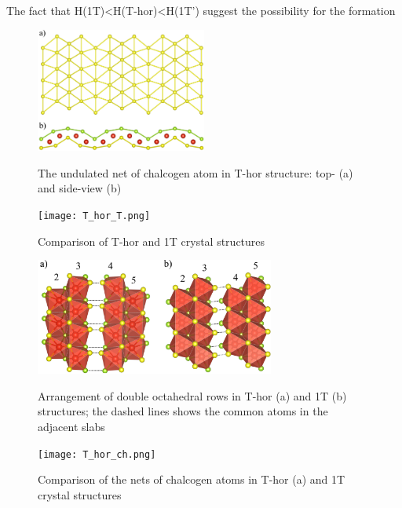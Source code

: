 \documentclass[a4paperm]{article}
\begin{document}
The fact that H(1T)<H(T-hor)<H(1T') suggest the possibility for the formation

\begin{figure}[H]
        \includegraphics[width=0.5\textwidth]{T_hor_hcb.png} \\
        \caption{The undulated net of chalcogen atom in T-hor structure: top- (a) and side-view (b)}
\label{T_hor_hcb}
\end{figure}


\begin{figure}[H]
	\texttt{[image: T\_hor\_T.png]} \\
	\caption{Comparison of T-hor and 1T crystal structures}
	\label{T_hor_T}
\end{figure}

\begin{figure}[H]
	\includegraphics[width=0.7\textwidth]{T_hor_slabs.png} \\
	\caption{Arrangement of double octahedral rows in T-hor (a) and 1T (b) structures; the dashed lines shows the common atoms in the adjacent slabs}
	\label{T_hor_slabs}
\end{figure}

\begin{figure}[H]
	\texttt{[image: T\_hor\_ch.png]} \\
	\caption{Comparison of the nets of chalcogen atoms in T-hor (a) and 1T crystal structures }
	\label{T_hor_ch}
\end{figure}
\end{document}
